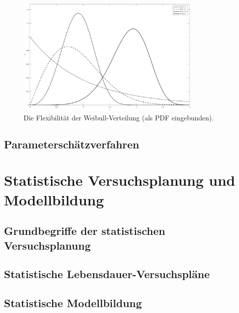 \begin{figure}[h!]
    \centering
    \includegraphics[width=0.8\textwidth]{plots/weibull_pdf_flexibility}
    \caption{Die Flexibilität der Weibull-Verteilung (als PDF eingebunden).}
    \label{fig:weibull_pdf}
\end{figure}
\subsection{Parameterschätzverfahren} \label{subsec:schätzer}

\section{Statistische Versuchsplanung und Modellbildung} \label{sec:doe}

\subsection{Grundbegriffe der statistischen Versuchsplanung} \label{subsec:begriffedoe}

\subsection{Statistische Lebensdauer-Versuchspläne} \label{subsec:pläne}

\subsection{Statistische Modellbildung} \label{subsec:model}
